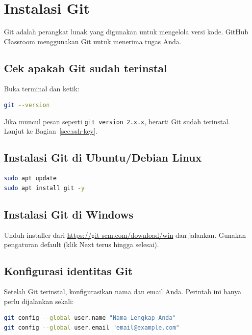 \documentclass[
    a4paper,
    11pt,
    parskip=half
]{scrartcl}
\begin{document}
\section{Instalasi Git}
\label{sec:install-git}

Git adalah perangkat lunak yang digunakan untuk mengelola versi kode. GitHub Classroom menggunakan Git untuk menerima tugas Anda.

\subsection*{Cek apakah Git sudah terinstal}

Buka terminal dan ketik:

\begin{lstlisting}[language=bash]
git --version
\end{lstlisting}

Jika muncul pesan seperti \texttt{git version 2.x.x}, berarti Git sudah terinstal. Lanjut ke Bagian~\ref{sec:ssh-key}.

\subsection*{Instalasi Git di Ubuntu/Debian Linux}

\begin{lstlisting}[language=bash]
sudo apt update
sudo apt install git -y
\end{lstlisting}

\subsection*{Instalasi Git di Windows}

Unduh installer dari \url{https://git-scm.com/download/win} dan jalankan. Gunakan pengaturan default (klik Next terus hingga selesai).

\subsection*{Konfigurasi identitas Git}

Setelah Git terinstal, konfigurasikan nama dan email Anda. Perintah ini hanya perlu dijalankan sekali:

\begin{lstlisting}[language=bash]
git config --global user.name "Nama Lengkap Anda"
git config --global user.email "email@example.com"
\end{lstlisting}
\end{document}
